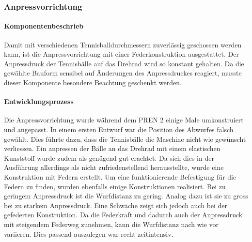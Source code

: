 \subsubsection{Anpressvorrichtung}

\paragraph{Komponentenbeschrieb\\}
Damit mit verschiedenen Tennisballdurchmessern zuverlässig geschossen werden kann, ist die Anpressvorrichtung mit einer Federkonstruktion ausgestattet. Der Anpressdruck der Tennisbälle auf das Drehrad wird so konstant gehalten. Da die gewählte Bauform sensibel auf Änderungen des Anpressdruckes reagiert, musste dieser Komponente besondere Beachtung geschenkt werden. 

\paragraph{Entwicklungsprozess\\}
Die Anpressvorrichtung wurde während dem PREN 2 einige Male umkonstruiert und angepasst. In einem ersten Entwurf war die Position des Abwurfes falsch gewählt. Dies führte dazu, dass die Tennisbälle die Maschine nicht wie gewünscht verliessen. Ein anpressen der Bälle an das Drehrad mit einem elastischen Kunststoff wurde zudem als genügend gut erachtet. Da sich dies in der Ausführung allerdings als nicht zufriedenstellend herausstellte, wurde eine Konstruktion mit Federn erstellt. Um eine funktionierende Befestigung für die Federn zu finden, wurden ebenfalls einige Konstruktionen realisiert. Bei zu geringem Anpressdruck ist die Wurfdistanz zu gering. Analog dazu ist sie zu gross bei zu starkem Anpressdruck. Eine Schwäche zeigt sich jedoch auch bei der gefederten Konstruktion. Da die Federkraft und dadurch auch der Anpressdruck mit steigendem Federweg zunehmen, kann die Wurfdistanz nach wie vor variieren. Dies passend auszulegen war recht zeitintensiv.